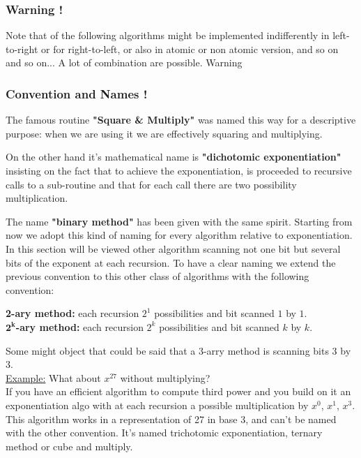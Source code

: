 \subsubsection*{Warning !}
Note that of the following algorithms might be implemented indifferently
in left-to-right or for right-to-left, or also in atomic or non atomic
version, and so on and so on... A lot of combination are possible. Warning
\subsubsection{Convention and Names !}

The famous routine \textbf{"Square \& Multiply"} was named this way for a descriptive purpose: when we are using it we are effectively squaring and multiplying.

On the other hand it's mathematical name is \textbf{"dichotomic exponentiation"}
insisting on the fact that to achieve the exponentiation, is proceeded to recursive
calls to a sub-routine and that for each call there are two possibility 
multiplication.

The name \textbf{"binary method"} has been given with the same spirit.
Starting from now we adopt this kind of naming for every algorithm relative to
exponentiation. In this section will be viewed other algorithm scanning not
one bit but several bits of the exponent at each recursion. To have a clear
naming we extend the previous convention to this other class of algorithms
with the following convention:

\begin{center}
\textbf{2-ary method:} each recursion
$2^1$ possibilities and bit scanned $1$ by $1$. \\
\textbf{$ \mathbf{2^k}$-ary method:} each recursion
$2^k$ possibilities and bit scanned $k$ by $k$.
\end{center}
\vspace{3mm}
Some might object that could be said that a 3-arry method is scanning bits 3 by 3.\\
\underline{Example:} What about $ x ^ {27} $ without multiplying?\\
If you have an efficient algorithm to compute third power and
you build on it an exponentiation algo with at each recursion
a possible multiplication by $x^0$, $x^1$, $x^3$.
This algorithm works in a representation of 27 in base 3, and can't be named
with the other convention.
It's named trichotomic exponentiation, ternary method or cube and multiply.
\vspace{3mm}